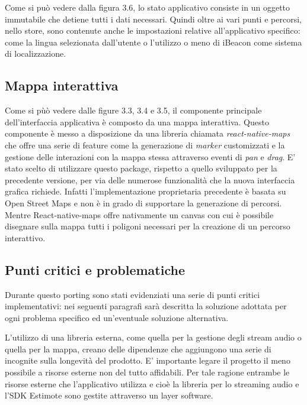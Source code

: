 Come si può vedere dalla figura 3.6, lo stato applicativo consiste in un oggetto immutabile che detiene tutti i dati necessari. Quindi oltre ai vari punti e percorsi, nello store, sono contenute anche le impostazioni relative all'applicativo specifico: come la lingua selezionata dall'utente o l'utilizzo o meno di iBeacon come sistema di localizzazione.\vspace{5mm}

\subsection{Mappa interattiva}\vspace{5mm}

Come si pùò vedere dalle figure 3.3, 3.4 e 3.5, il componente principale dell'interfaccia applicativa è composto da una mappa interattiva. Questo componente è messo a disposizione da una libreria chiamata \emph{react-native-maps} che offre una serie di feature come la generazione di \emph{marker} customizzati e la gestione delle interazioni con la mappa stessa attraverso eventi di \emph{pan} e \emph{drag}. E' stato scelto di utilizzare questo package, rispetto a quello sviluppato per la precedente versione, per via delle numerose funzionalità che la nuova interfaccia grafica richiede. Infatti l'implementazione proprietaria precedente è basata su Open Street Maps e non è in grado di supportare la generazione di percorsi. Mentre React-native-maps offre nativamente un canvas con cui è possibile disegnare sulla mappa tutti i poligoni necessari per la creazione di un percorso interattivo. \vspace{5mm}

\subsection{Punti critici e problematiche}\vspace{5mm}

Durante questo porting sono stati evidenziati una serie di punti critici implementativi: nei seguenti paragrafi sarà descritta la soluzione adottata per ogni problema specifico ed un'eventuale soluzione alternativa.\vspace{5mm}

L’utilizzo di una libreria esterna, come quella per la gestione degli stream audio o quella per la mappa, creano delle dipendenze che aggiungono una serie di incognite sulla longevità del prodotto. E’ importante legare il progetto il meno possibile a risorse esterne non del tutto affidabili. Per tale ragione entrambe le risorse esterne che l’applicativo utilizza e cioè la libreria per lo streaming audio e l’SDK Estimote sono gestite attraverso un layer software.\vspace{5mm}

